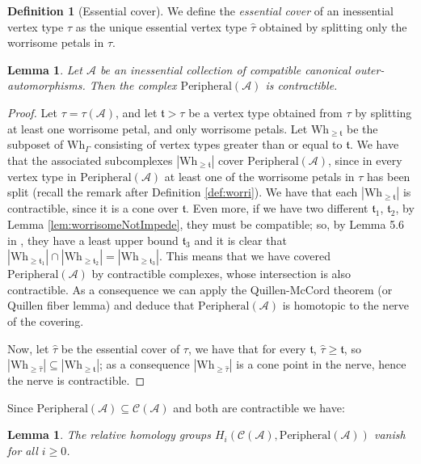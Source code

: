 \documentclass[a4paper]{amsart}
\newcommand{\G}{\Gamma}
\newcommand{\au}{\mathcal{A}}
\newcommand{\Wh}{\mathrm{Wh}}
\newcommand{\peria}{\mathrm{Peripheral}(\au)}
\newtheorem{lem}[teo]{Lemma}
\theoremstyle{definition}
\newtheorem{defi}[teo]{Definition}
\theoremstyle{remark}
\begin{document}
\begin{defi}[Essential cover]
We define the {\sl essential cover} of  an inessential vertex type $\tau$ as the unique essential vertex type $\widehat{\tau}$ obtained by splitting only the worrisome petals in $\tau$.
\end{defi}




\begin{lem}
    Let $\au$ be an inessential collection of compatible canonical outer-automorphisms. Then the complex $\peria$  is contractible. \label{lem:periContr}
\end{lem}

\begin{proof}

   Let $\tau=\tau(\au)$, and let $\mathfrak{t}>\tau$ be a vertex type obtained from $\tau$ by splitting at least one worrisome petal, and only worrisome petals.  Let $\Wh_{\geq\mathfrak{t}}$ be the subposet of $\Wh_\G$ consisting of vertex types greater than or equal to $\mathfrak{t}$. We have that the associated  subcomplexes $|\Wh_{\geq\mathfrak{t}}|$ cover $\peria$, since in every vertex type in $\peria$  at least one of the worrisome petals in $\tau$ has been split (recall the remark after Definition \ref{def:worri}).   
   We have that each $|\Wh_{\geq\mathfrak{t}}|$ is contractible, since it is a cone over $\mathfrak{t}$. Even more, if we have two different   $\mathfrak{t}_1$, $\mathfrak{t}_2$, by Lemma \ref{lem:worrisomeNotImpede}, they must be compatible;  so, by Lemma  5.6 in \cite{ArMar}, they have a least upper bound $\mathfrak{t}_3$ and it is clear that $|\Wh_{\geq\mathfrak{t}_1}|\cap |\Wh_{\geq\mathfrak{t}_2}|= |\Wh_{\geq\mathfrak{t}_3}|$. This means that we have covered $\peria$ by contractible complexes, whose intersection is also contractible. As a consequence we can apply the Quillen-McCord theorem (or Quillen fiber lemma) and deduce that $\peria$ is homotopic to the nerve of the covering.

   Now, let $\widehat{\tau}$ be the essential cover of $\tau$, we have that for every $\mathfrak{t}$, $\widehat{\tau}\geq\mathfrak{t}$, so $|\Wh_{\geq\widehat{\tau}}|\subseteq |\Wh_{\geq\mathfrak{t}}| $; as a consequence $|\Wh_{\geq\widehat{\tau}}|$ is a cone point in the nerve, hence the nerve is contractible. 






   
\end{proof}
Since $\peria\subseteq\mathcal{C}(\au)$ and both are contractible we have:
\begin{lem}
    The relative homology groups $H_i(\mathcal{C}(\au),\peria)$ vanish for all $i\geq0$.
    \label{lem:HomoRel}
\end{lem}
\end{document}
